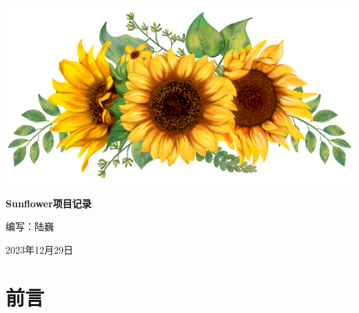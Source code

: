 \documentclass[oneside]{book}
\begin{document}
  \begin{titlepage}%
    \begin{center}
      \includegraphics[width=.3\textwidth]{images/cover.png}

      \vspace{2ex}

      \Huge\textbf{Sunflower项目记录}\normalsize

      \vspace{8ex}

      编写：陆巍




    \vfill

    2023年12月29日
    \end{center}

  \end{titlepage}


  \frontmatter%


  \chapter{前言}


  \tableofcontents%


  \mainmatter

  
\end{document}
